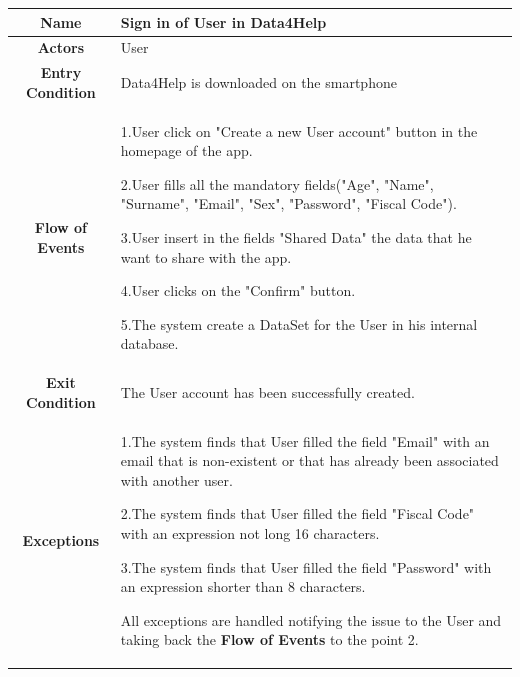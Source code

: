 
      \begin{table}[h!]
        \centering
        \begin{tabularx}{\linewidth}{|c|X|}
          \hline

          \textbf{Name} & Sign in of User in Data4Help\\
        	\hline

        	\textbf{Actors} & User \\
        	\hline

        	\textbf{Entry Condition} & Data4Help is downloaded on the smartphone \\
        	\hline

        	\textbf{Flow of Events} & 1.User click on "Create a new User account" button in the homepage of the app.

        					2.User fills all the mandatory fields("Age", "Name", "Surname", "Email", "Sex", "Password", "Fiscal 							Code").

        					3.User insert in the fields "Shared Data" the data that he want to share with the app.

        					4.User clicks on the "Confirm" button.

        					5.The system create a DataSet for the User in his internal database.\\
        	\hline

        	\textbf{Exit Condition} & The User account has been successfully created. \\
        	\hline

        	\textbf{Exceptions} &
        					1.The system finds that User filled the field "Email"  with an email that is non-existent or that has 							already been associated with another user.

        					2.The system finds that User filled the field "Fiscal Code" with an expression not long 16 								characters.

        					3.The system finds that User filled the field "Password" with an expression shorter than 8 								characters.

        					All exceptions are handled notifying the issue to the User and taking back the \textbf{Flow of 							Events} to the point 2.\\
          \hline
        \end{tabularx}
      \end{table}

